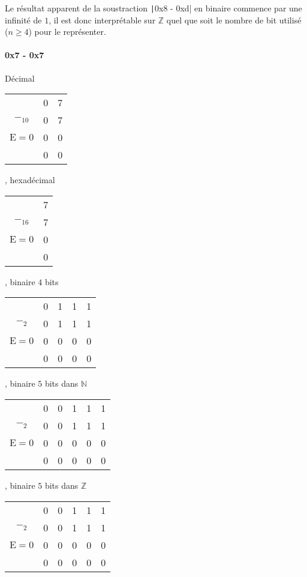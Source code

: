 \documentclass[french, 12pt, a4paper]{article}
\begin{document}
Le résultat apparent de la soustraction \texttt|0x8 - 0xd| en binaire commence par une infinité de $1$, il est donc interprétable sur $\mathbb{Z}$ quel que soit le nombre de bit utilisé ($n \ge 4$) pour le représenter.

\paragraph{0x7 - 0x7}

Décimal
\begin{tabular}[c]{ccc}
					& 0 & 7	\\
$-_{10}$			& 0 & 7 \\
$\mathrm{E} = 0$	& 0 & 0 \\	\cline{2-3}
					& 0 & 0 \\
\end{tabular}
, hexadécimal
\begin{tabular}[c]{cc}
					& 7	\\
$-_{16}$			& 7 \\
$\mathrm{E} = 0$	& 0 \\	\cline{2-2}
					& 0 \\
\end{tabular}
, binaire $4$ bits
\begin{tabular}[c]{ccccc}
					& 0 & 1 & 1 & 1	\\
$-_2$				& 0 & 1 & 1 & 1 \\
$\mathrm{E} = 0$ 	& 0 & 0 & 0 & 0 \\	\cline{2-5}
					& 0 & 0 & 0 & 0 \\
\end{tabular}
, binaire $5$ bits dans $\mathbb{N}$
\begin{tabular}[c]{cccccc}
					& 0 & 0 & 1 & 1 & 1	\\
$-_2$				& 0 & 0 & 1 & 1 & 1 \\
$\mathrm{E} = 0$ 	& 0 & 0 & 0 & 0 & 0 \\	\cline{2-6}
					& 0 & 0 & 0 & 0 & 0 \\
\end{tabular}
, binaire $5$ bits dans $\mathbb{Z}$
\begin{tabular}[c]{cccccc}
					& 0 & 0 & 1 & 1 & 1	\\
$-_2$				& 0 & 0 & 1 & 1 & 1 \\
$\mathrm{E} = 0$ 	& 0 & 0 & 0 & 0 & 0 \\	\cline{2-6}
					& 0 & 0 & 0 & 0 & 0 \\
\end{tabular}
\end{document}
